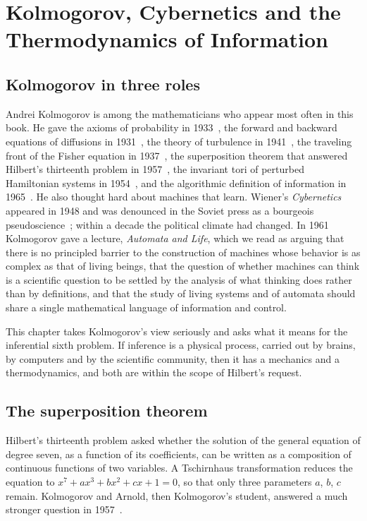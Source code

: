 \chapter{Kolmogorov, Cybernetics and the Thermodynamics of Information}
\label{ch:kolmogorov}

\section{Kolmogorov in three roles}

Andrei Kolmogorov is among the mathematicians who appear most often in this book. He gave the axioms of probability in 1933~\cite{kolmogorov1933}, the forward and backward equations of diffusions in 1931~\cite{kolmogorov1931}, the theory of turbulence in 1941~\cite{kolmogorov1941a}, the traveling front of the Fisher equation in 1937~\cite{kolmogorov1937}, the superposition theorem that answered Hilbert's thirteenth problem in 1957~\cite{kolmogorov1957}, the invariant tori of perturbed Hamiltonian systems in 1954~\cite{kolmogorov1954}, and the algorithmic definition of information in 1965~\cite{kolmogorov1965}. He also thought hard about machines that learn. Wiener's \emph{Cybernetics}~\cite{wiener1948} appeared in 1948 and was denounced in the Soviet press as a bourgeois pseudoscience~\cite{gerovitch2002}; within a decade the political climate had changed. In 1961 Kolmogorov gave a lecture, \emph{Automata and Life}, which we read as arguing that there is no principled barrier to the construction of machines whose behavior is as complex as that of living beings, that the question of whether machines can think is a scientific question to be settled by the analysis of what thinking does rather than by definitions, and that the study of living systems and of automata should share a single mathematical language of information and control.

This chapter takes Kolmogorov's view seriously and asks what it means for the inferential sixth problem. If inference is a physical process, carried out by brains, by computers and by the scientific community, then it has a mechanics and a thermodynamics, and both are within the scope of Hilbert's request.

\section{The superposition theorem}

Hilbert's thirteenth problem asked whether the solution of the general equation of degree seven, as a function of its coefficients, can be written as a composition of continuous functions of two variables. A Tschirnhaus transformation reduces the equation to $x^7+ax^3+bx^2+cx+1 = 0$, so that only three parameters $a$, $b$, $c$ remain. Kolmogorov and Arnold, then Kolmogorov's student, answered a much stronger question in 1957~\cite{kolmogorov1957}.

